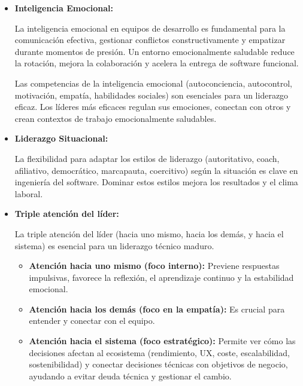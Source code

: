 \documentclass[a4paper,12pt,twoside]{article}
\begin{document}
    \begin{itemize}
        \item \textbf{Inteligencia Emocional:} 
        
        La inteligencia emocional en equipos de desarrollo es fundamental para la comunicación efectiva, 
        gestionar conflictos constructivamente y empatizar durante momentos de presión. Un entorno 
        emocionalmente saludable reduce la rotación, mejora la colaboración y acelera la entrega de 
        software funcional.

        Las competencias de la inteligencia emocional (autoconciencia, autocontrol, motivación, empatía, 
        habilidades sociales) son esenciales para un liderazgo eficaz. Los líderes más eficaces regulan 
        sus emociones, conectan con otros y crean contextos de trabajo emocionalmente saludables.

        \item \textbf{Liderazgo Situacional:}

        La flexibilidad para adaptar los estilos de liderazgo (autoritativo, coach, afiliativo, 
        democrático, marcapauta, coercitivo) según la situación es clave en ingeniería del software. 
        Dominar estos estilos mejora los resultados y el clima laboral.

        \item \textbf{Triple atención del líder:}
        
        La triple atención del líder (hacia uno mismo, hacia los demás, y hacia el sistema) es esencial 
        para un liderazgo técnico maduro.

        \begin{itemize}
            \item \textbf{Atención hacia uno mismo (foco interno):} Previene respuestas impulsivas, 
            favorece la reflexión, el aprendizaje continuo y la estabilidad emocional.
            \item \textbf{Atención hacia los demás (foco en la empatía):} Es crucial para entender y 
            conectar con el equipo.
            \item \textbf{Atención hacia el sistema (foco estratégico):} Permite ver cómo las decisiones 
            afectan al ecosistema (rendimiento, UX, coste, escalabilidad, sostenibilidad) y conectar decisiones técnicas con objetivos de negocio, ayudando a evitar deuda técnica y gestionar el cambio.
        \end{itemize}
    \end{itemize}
\end{document}
